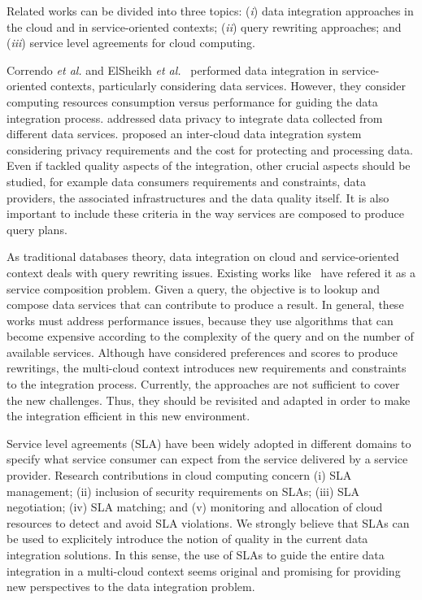 Related works can be divided into three topics: (\textit{i}) data integration approaches in the cloud and in service-oriented contexts; (\textit{ii}) query rewriting approaches; and (\textit{iii}) service level agreements for cloud computing.

Correndo \textit{et al.} and ElSheikh \textit{et al.}~\cite{Correndo2010,ElSheikh2013} performed data integration in service-oriented contexts, particularly considering data services. However, they  consider computing resources consumption versus performance for guiding the data integration process. \cite{YauY08} addressed data privacy  to integrate data collected from different data services. \cite{Tian2010} proposed an inter-cloud data integration system considering privacy requirements and the cost for protecting and processing data. Even if \cite{Tian2010,YauY08} tackled quality aspects of the integration,  other crucial aspects  should be studied, for example data consumers requirements and constraints, data providers, the associated infrastructures and the data quality itself. It is also important to include these criteria in the way services are composed to produce  query plans.

As traditional databases theory, data integration on cloud and service-oriented context deals with query rewriting issues. Existing works like~\cite{ba2014,Barhamgi2010,Benouaret2011,Umberto} have refered it as a service composition problem. Given a query, the objective is to lookup and compose data services that can contribute to produce a result. In general, these works must address performance issues, because they use algorithms that can become expensive according to the complexity of the query and on the number of available services. Although \cite{ba2014,Benouaret2011} have considered preferences and scores to produce rewritings, the multi-cloud context introduces new requirements and constraints to the integration process. Currently, the approaches are not sufficient to cover the new challenges. Thus, they should be revisited and adapted in order to make the integration efficient in this new environment. 

Service level agreements (SLA) have been widely adopted in different domains to specify what service consumer can expect from the service delivered by a service provider. Research contributions in cloud computing concern (i) SLA management; (ii) inclusion of security requirements on SLAs; (iii) SLA negotiation; (iv) SLA matching; and (v) monitoring and allocation of cloud resources to detect and avoid SLA violations. 
We strongly believe that SLAs can be used  to explicitely introduce the notion of quality in the current data integration solutions. In this sense, the use of SLAs to guide the entire data integration in a multi-cloud context seems original and promising for providing new perspectives to the data integration problem.
